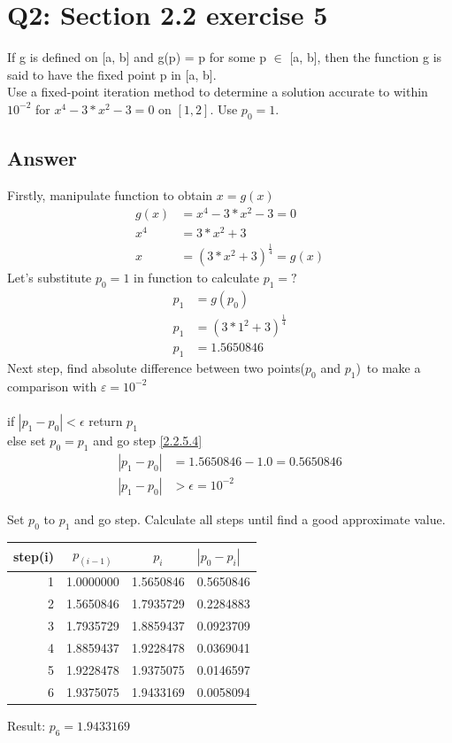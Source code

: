 \documentclass{article}
\begin{document}
\section{Q2: Section 2.2 exercise 5}
If g is defined on [a, b] and g(p) = p for some p $\in$ [a, b], then the function g is said to have the fixed point p in [a, b].\\

Use a fixed-point iteration method to determine a solution accurate to within $10^{-2}$ for $x^4-3*x^2-3 = 0$ on $[1, 2]$. Use $p_0 = 1$.
\subsection{Answer}
Firstly, manipulate function to obtain $x=g(x)$
\begin{align}
\label{2.2.5.1}
g(x) & = x^4-3*x^2-3 = 0\\
\label{2.2.5.2}
x^4 & = 3*x^2+3\\
\label{2.2.5.3}
x & = (3*x^2+3)^ \frac{1}{4}=g(x)
\end{align}
Let's substitute $p_0=1$ in function to calculate $p_1=?$\\
\begin{align}
\label{2.2.5.4}	p_1 & = g(p_0)\\
\label{2.2.5.5}	p_1 & = (3*1^2+3)^ \frac{1}{4}\\
\label{2.2.5.6} p_1 & = 1.5650846
\end{align}
Next step, find absolute difference between two points($p_0$ and $p_1$)\ to make a comparison with $\varepsilon = 10^{-2}$\\\\
if $|p_1-p_0|< \epsilon$ return $p_1$\\
else set $p_0=p_1$ and go step \ref{2.2.5.4}
\begin{align}
\label{2.2.5.7} |p_1-p_0| & = 1.5650846 - 1.0 = 0.5650846 \\
\label{2.2.5.8} |p_1-p_0| & > \epsilon=10^{-2}
\end{align}

Set $p_0$ to $p_1$ and go step. Calculate all steps until find a good approximate value.\\

\begin{tabular}{r|cc|l}
step(i) & $p_(i-1)$ & $p_i$ & $|p_0-p_i|$\\
\hline
1 & 1.0000000 & 1.5650846 & 0.5650846\\
2 & 1.5650846 & 1.7935729 & 0.2284883\\
3 & 1.7935729 & 1.8859437 & 0.0923709\\
4 & 1.8859437 & 1.9228478 & 0.0369041\\
5 & 1.9228478 & 1.9375075 & 0.0146597\\
6 & 1.9375075 & 1.9433169 & 0.0058094\\
\end{tabular}
Result: $p_6= 1.9433169$\\
\end{document}
